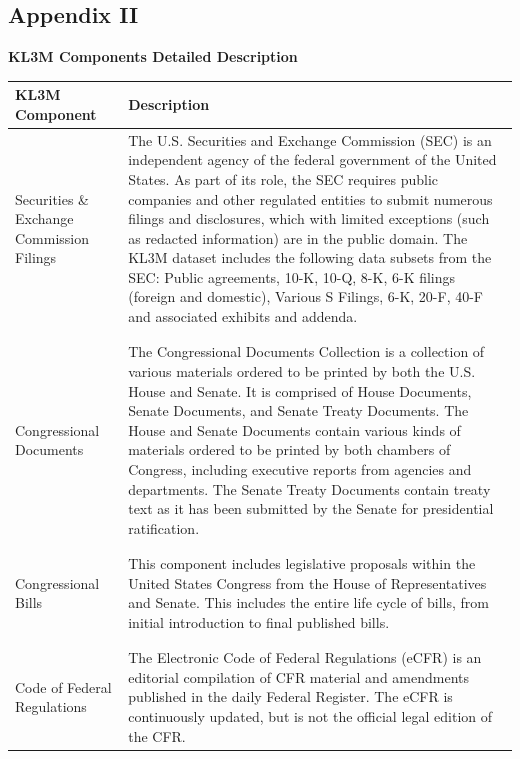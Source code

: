\documentclass{article}
\begin{document}
\begin{appendices}
\pagebreak
\section{\textbf{Appendix II}}
\setcounter{secnumdepth}{0}
\large {\textbf{KL3M Components Detailed Description}}
\begin{table}[h!]
\scriptsize
\begin{longtable}{ p{3cm} p{9cm} }
\textbf{KL3M Component}      
& \textbf{Description}  
\\\midrule
Securities \& Exchange Commission Filings & The U.S. Securities and Exchange Commission (SEC) is an independent agency of the federal government of the United States. As part of its role, the SEC requires public companies and other regulated entities to submit numerous filings and disclosures, which with limited exceptions (such as redacted information) are in the public domain. The KL3M dataset includes the following data subsets from the SEC: Public agreements, 10-K, 10-Q, 8-K, 6-K filings (foreign and domestic), Various S Filings, 6-K, 20-F, 40-F and associated exhibits and addenda.
\\
 \\\hline
 \\
Congressional Documents      
& The Congressional Documents Collection is a collection of various materials ordered to be printed by both the U.S. House and Senate. It is comprised of House Documents, Senate Documents, and Senate Treaty Documents. The House and Senate Documents contain various kinds of materials ordered to be printed by both chambers of Congress, including executive reports from agencies and departments. The Senate Treaty Documents contain treaty text as it has been submitted by the Senate for presidential ratification.
\\
 \\\hline
  \\
Congressional Bills &
This component includes legislative proposals within the United States Congress from the House of Representatives and Senate. This includes the entire life cycle of bills, from initial introduction to final published bills. 
\\   
 \\\hline
  \\
Code of Federal Regulations &
The Electronic Code of Federal Regulations (eCFR) is an editorial compilation of CFR material and amendments published in the daily Federal Register. The eCFR is continuously updated, but is not the official legal edition of the CFR. 

\end{longtable}
\end{table}
\end{appendices}
\end{document}
